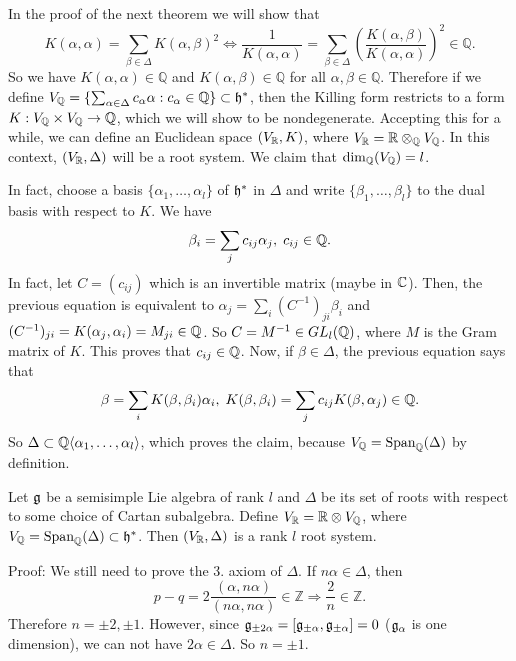 In the proof of the next theorem we will show that 
\begin{equation}
    K(\alpha,\alpha)=\sum_{\beta\in\Delta}K(\alpha,\beta)^2
    \iff \frac{1}{K(\alpha,\alpha)}=\sum_{\beta\in\Delta}(\frac{K(\alpha,\beta)}{K(\alpha,\alpha)})^2\in\mathbb{Q}.
\end{equation}
So we have $K(\alpha,\alpha)\in\mathbb{Q}$ and $K(\alpha,\beta)\in\mathbb{Q}$ for all $\alpha,\beta\in\mathbb{Q}$. Therefore 
if we define $V_{\mathbb{Q}}=\{\sum_{\alpha\in\Delta} c_\alpha\alpha:c_\alpha\in\mathbb{Q}\}\subset\mathfrak{h}^*$, then the Killing form 
restricts to a form $K:V_{\mathbb{Q}}\times V_{\mathbb{Q}}\to \mathbb{Q}$, which we will show to be nondegenerate. Accepting this for a while, we can 
define an Euclidean space $(V_{\mathbb{R}}, K)$, where $V_{\mathbb{R}}=\mathbb{R}\otimes_{\mathbb{Q}}V_{\mathbb{Q}}$. In this context, $(V_{\mathbb{R}},\Delta)$
will be a root system. We claim that $\dim_{\mathbb{Q}}(V_{\mathbb{Q}})=l$. 

In fact, choose a basis $\{\alpha_1,\dots,\alpha_l\}$ of $\mathfrak{h}^*$ in $\Delta$ and 
write $\{\beta_1,\dots,\beta_l\}$ to the dual basis with respect to $K$. We have 
\begin{equation}
    \beta_i=\sum_jc_{ij}\alpha_j,\; c_{ij}\in\mathbb{Q}.
\end{equation}
In fact, let $C=(c_{ij})$ which is an invertible matrix (maybe in $\mathbb{C}$). Then, the previous equation is equivalent to 
$\alpha_j = \sum_i (C^{-1})_{ji}\beta_i$ and $(C^{-1})_{ji}=K(\alpha_j,\alpha_i)=M_{ji}\in\mathbb{Q}$. 
So $C=M^{-1}\in GL_l(\mathbb{Q})$, where $M$ is the Gram matrix of $K$. This proves that $c_{ij}\in\mathbb{Q}$. Now, if $\beta\in\Delta$, 
the previous equation says that 
\begin{equation}
    \beta = \sum_i K(\beta,\beta_i)\alpha_i,\; K(\beta,\beta_i)=\sum_jc_{ij}K(\beta,\alpha_j)\in\mathbb{Q}.
\end{equation}
So $\Delta\subset \mathbb{Q}\langle \alpha_1,\dots,\alpha_l\rangle$, which proves the claim, because 
$V_{\mathbb{Q}}=\text{Span}_{\mathbb{Q}}(\Delta)$ by definition. 




\begin{dang}
    \begin{theorem}
        Let $\mathfrak{g}$ be a semisimple Lie algebra of rank $l$ and $\Delta$ be 
        its set of roots with respect to some choice of Cartan subalgebra. Define $V_{\mathbb{R}}=\mathbb{R}\otimes V_{\mathbb{Q}}$, where 
        $V_{\mathbb{Q}}=\text{Span}_{\mathbb{Q}}(\Delta)\subset\mathfrak{h}^*$. Then 
        $(V_{\mathbb{R}},\Delta)$ is a rank $l$ root system.
    \end{theorem}
\end{dang}
Proof: We still need to prove the 3. axiom of $\Delta$. If $n\alpha\in\Delta$, then 
\begin{equation}
  p-q= 2\frac{(\alpha,n\alpha)}{(n\alpha,n\alpha)}\in\mathbb{Z}\Rightarrow \frac{2}{n}\in\mathbb{Z}.
\end{equation}
Therefore $n=\pm2,\pm1$. However, since $\mathfrak{g}_{\pm2\alpha}=[\mathfrak{g}_{\pm\alpha},\mathfrak{g}_{\pm\alpha}]=0$ 
($\mathfrak{g}_\alpha$ is one dimension), we can not have $2\alpha\in\Delta$. So $n=\pm1$.\par

